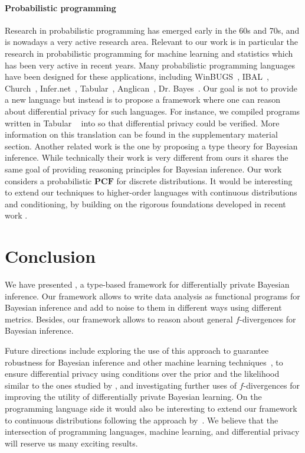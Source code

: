 \documentclass{sig-alternate-05-2015}
\theoremstyle{plain}
\theoremstyle{definition}
\theoremstyle{corollary}
\def\pcf{\ensuremath{\mathbf{PCF}}\xspace}
\newcommand{\fdiv}{\ensuremath{f}}
\begin{document}
\paragraph*{Probabilistic programming}
Research in probabilistic programming has emerged early in the 60s and
70s, and is nowadays a very active research area. Relevant to our work is in particular the research in probabilistic programming
for machine learning and statistics which has been very active in
recent years. Many probabilistic programming languages have been
designed for these applications, including WinBUGS~\citep{LunnTBS00},
IBAL~\citep{Pfeffer01}, Church~\citep{DBLP:conf/uai/GoodmanMRBT08},
Infer.net~\citep{InferNET12}, Tabular~\citep{GordonGRRBG14},
Anglican~\citep{TolpinMW15}, Dr. Bayes~\citep{TorontoMH15}. Our goal is not
to provide a new language but instead is to propose a framework where
one can reason about differential privacy for such languages.
For instance, we compiled programs written in Tabular ~\citep{GordonGRRBG14}  into \THESYSTEM
so that differential privacy could be verified. More information on this translation can be found in the supplementary material section.
Another related work is the one by \citet{AdamsJ15} proposing a type theory for Bayesian inference. While
technically their work is very different from ours it shares the 
same goal of providing reasoning principles for Bayesian inference.
Our work considers a probabilistic \pcf for discrete distributions.
It would be interesting to extend our techniques to higher-order languages with continuous distributions and conditioning,
by building on the rigorous foundations developed in recent work \cite{lics16,icfp16}.

\section{Conclusion}
We have presented \THESYSTEM, a type-based framework for differentially private
Bayesian inference. Our framework allows to write data analysis as
functional programs for Bayesian inference and add to noise to them in different
ways using different metrics. Besides, our framework allows to reason about general
\fdiv-divergences for Bayesian inference. 

Future directions include exploring the use of this approach to
guarantee robustness for Bayesian inference and other machine learning
techniques~\citep{Dey1994287}, to ensure differential privacy using conditions
over the prior and the likelihood similar to the ones studied by
\citet{Zheng16,ZhangRD16}, and investigating further uses of \fdiv-divergences for
improving the utility of differentially private Bayesian
learning. On the programming language side it would also be
interesting to extend our framework to continuous distributions
following the approach by~\citet{sato2016}. We
believe that the intersection of programming languages, machine
learning, and differential privacy will reserve us many exciting results.



\end{document}
